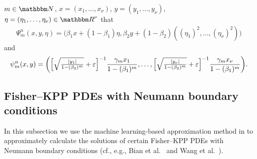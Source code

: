 \begin{algo}
	$m\in\N$,
	$x=(x_1, \ldots, x_{\nu})$, $y=(y_1, \ldots, y_{\nu})$, $\eta = ( \eta_1, \ldots , \eta_{\nu} )\in\R^{\nu}$
	that
	\begin{align}\label{eq:examples_setting_moment_estimation}
	\Psi^n_m ( x , y , \eta )
	=
	\bigl(\beta_1 x + (1-\beta_1) \eta, \beta_2 y + (1-\beta_2) ((\eta_1)^2,\ldots,(\eta_{\nu})^2)\bigr) %
	\end{align}
	and
	\begin{align}\label{eq:examples_setting_adam_grad_update}
	\psi^n_m ( x,y ) =
	\biggl(
	\Bigl[
	\sqrt{\tfrac{|y_1|}{1-(\beta_2)^m}} + \varepsilon
	\Bigr]^{-1}
	\frac{\gamma_m x_{1}}{1-(\beta_1)^m},
	\ldots,
	\Bigl[
	\sqrt{\tfrac{|y_{\nu}|}{1-(\beta_2)^m}} + \varepsilon
	\Bigr]^{-1}
	\frac{\gamma_m x_{\nu}}{1-(\beta_1)^m}
	\biggr).
	\end{align}
\end{algo}
%
%
%


\subsection{Fisher--KPP PDEs with Neumann boundary conditions}
\label{subsec:fisherKPP_neumann_r}
In this subsection we use the machine learning-based approximation method in  to approximately calculate the solutions of certain Fisher--KPP PDEs with Neumann boundary conditions (cf., e.g., Bian et al.~\cite{Bian2017} and Wang et al.~\cite{Wang2021}).


